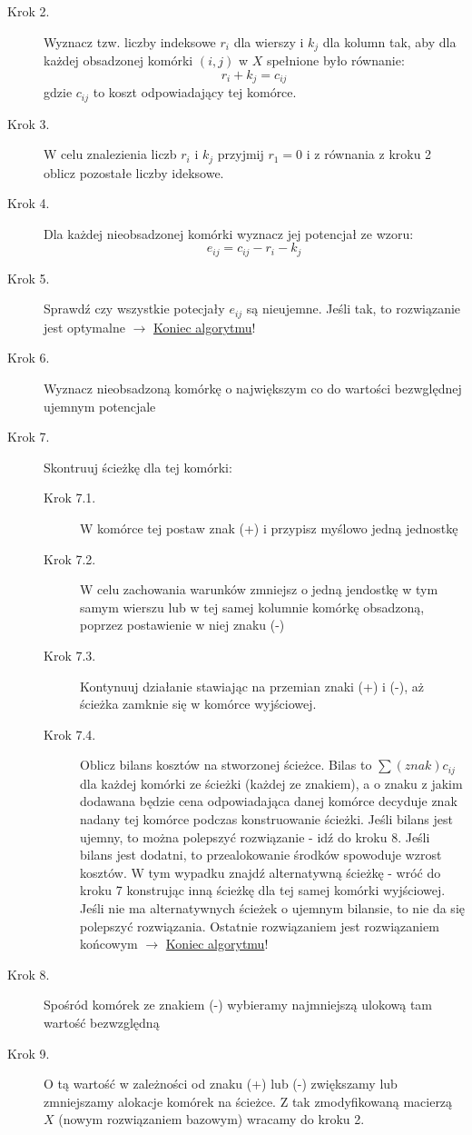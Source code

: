 \documentclass[11pt]{article}
\begin{document}
\begin{description}
\begin{description}
    \end{description}
    \item[Krok 2.] Wyznacz tzw. liczby indeksowe $r_i$ dla wierszy i $k_j$ dla kolumn tak, aby dla każdej obsadzonej komórki $(i,j)$ w $X$ spełnione było równanie:$$r_{i} + k_{j} = c_{ij} $$
    gdzie $c_{ij}$ to koszt odpowiadający tej komórce.
    \item[Krok 3.] W celu znalezienia liczb $r_i$ i $k_j$ przyjmij $r_{1}=0$ i z równania z kroku 2 oblicz pozostałe liczby ideksowe.
    \item[Krok 4.] Dla każdej nieobsadzonej komórki wyznacz jej potencjał ze wzoru: $$e_{ij}=c_{ij}-r_{i}-k_{j}$$
    \item[Krok 5.] Sprawdź czy wszystkie potecjały $e_{ij}$ są nieujemne. Jeśli tak, to rozwiązanie jest optymalne $\to$ \underline{Koniec algorytmu}!
    \item[Krok 6.] Wyznacz nieobsadzoną komórkę o największym co do wartości bezwględnej ujemnym potencjale
    \item[Krok 7.] Skontruuj ścieżkę dla tej komórki:
    \begin{description}
        \item[Krok 7.1.] W komórce tej postaw znak (+) i przypisz myślowo jedną jednostkę
        \item[Krok 7.2.] W celu zachowania warunków zmniejsz o jedną jendostkę w tym samym wierszu lub w tej samej kolumnie komórkę obsadzoną, poprzez postawienie w niej znaku (-)
        \item[Krok 7.3.] Kontynuuj działanie stawiając na przemian znaki (+) i (-), aż ścieżka zamknie się w komórce wyjściowej.
        \item[Krok 7.4.] Oblicz bilans kosztów na stworzonej ścieżce. Bilas to $\sum (znak)c_{ij}$ dla każdej komórki ze ścieżki (każdej ze znakiem), a o znaku z jakim dodawana będzie cena odpowiadająca danej komórce decyduje znak nadany tej komórce podczas konstruowanie ścieżki. Jeśli bilans jest ujemny, to można polepszyć rozwiązanie - idź do kroku 8. Jeśli bilans jest dodatni, to przealokowanie środków spowoduje wzrost kosztów. W tym wypadku znajdź alternatywną ścieżkę - wróć do kroku 7 konstrując inną ścieżkę dla tej samej komórki wyjściowej. Jeśli nie ma alternatywnych ścieżek o ujemnym bilansie, to nie da się polepszyć rozwiązania. Ostatnie rozwiązaniem jest rozwiązaniem końcowym $\to$ \underline{Koniec algorytmu}!
    \end{description}
    \item[Krok 8.] Spośród komórek ze znakiem (-) wybieramy najmniejszą ulokową tam wartość bezwzględną
    \item[Krok 9.] O tą wartość w zależności od znaku (+) lub (-) zwiększamy lub zmniejszamy alokacje komórek na ścieżce. Z tak zmodyfikowaną macierzą $X$ (nowym rozwiązaniem bazowym) wracamy do kroku 2.
\end{description}
\end{document}

